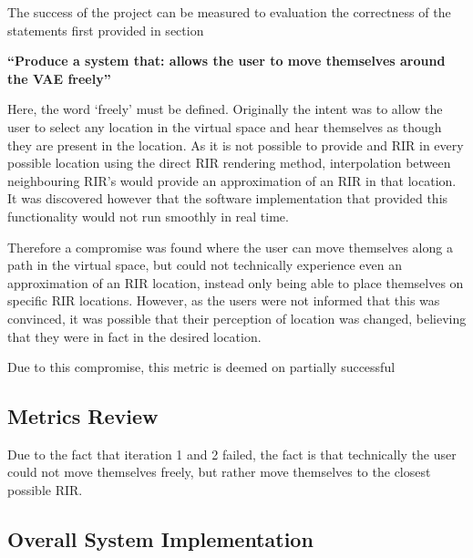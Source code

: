 \documentclass[../../main.tex]{subfiles}
\begin{document}
			The success of the project can be measured to evaluation the correctness of the statements first provided in section 

			\vspace{5mm}
			\begin{center}
			\begin{minipage}{0.7\textwidth}
			\textbf{``Produce a system that: allows the user to move themselves around the \ac{VAE} freely''}
			\end{minipage}
			\end{center}
			\vspace{5mm}

			Here, the word `freely' must be defined. Originally the intent was to allow the user to select any location in the virtual space and hear themselves as though they are present in the location. As it is not possible to provide and \ac{RIR} in every possible location using the direct \ac{RIR} rendering method, interpolation between neighbouring \ac{RIR}'s would provide an approximation of an \ac{RIR} in that location. It was discovered however that the software implementation that provided this functionality would not run smoothly in real time.

			 Therefore a compromise was found where the user can move themselves along a path in the virtual space, but could not technically experience even an approximation of an \ac{RIR} location, instead only being able to place themselves on specific \ac{RIR} locations. However, as the users were not informed that this was convinced, it was possible that their perception of location was changed, believing that they were in fact in the desired location.

			Due to this compromise, this metric is deemed on partially successful








		\subsection{Metrics Review}

		Due to the fact that iteration 1 and 2 failed, the fact is that technically the user could not move themselves freely, but rather move themselves to the closest possible \ac{RIR}.

		\subsection{Overall System Implementation}
\end{document}
